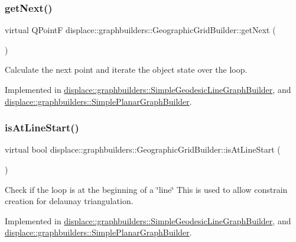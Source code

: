 \subsubsection{\texorpdfstring{getNext()}{getNext()}}
{\footnotesize\ttfamily virtual Q\+PointF displace\+::graphbuilders\+::\+Geographic\+Grid\+Builder\+::get\+Next (\begin{DoxyParamCaption}{ }\end{DoxyParamCaption})\hspace{0.3cm}{\ttfamily [pure virtual]}}



Calculate the next point and iterate the object state over the loop. 



Implemented in \mbox{\hyperlink{classdisplace_1_1graphbuilders_1_1_simple_geodesic_line_graph_builder_a219f40fcae3c1463aa7f818687ed5f39}{displace\+::graphbuilders\+::\+Simple\+Geodesic\+Line\+Graph\+Builder}}, and \mbox{\hyperlink{classdisplace_1_1graphbuilders_1_1_simple_planar_graph_builder_a58f7a91f6889c37b462abaaf0844c49b}{displace\+::graphbuilders\+::\+Simple\+Planar\+Graph\+Builder}}.

\mbox{\label{classdisplace_1_1graphbuilders_1_1_geographic_grid_builder_ac04ab8be97b357bb12f9745a012f6a5f}} 
\subsubsection{\texorpdfstring{isAtLineStart()}{isAtLineStart()}}
{\footnotesize\ttfamily virtual bool displace\+::graphbuilders\+::\+Geographic\+Grid\+Builder\+::is\+At\+Line\+Start (\begin{DoxyParamCaption}{ }\end{DoxyParamCaption})\hspace{0.3cm}{\ttfamily [pure virtual]}}



Check if the loop is at the beginning of a \char`\"{}line\char`\"{} This is used to allow constrain creation for delaunay triangulation. 



Implemented in \mbox{\hyperlink{classdisplace_1_1graphbuilders_1_1_simple_geodesic_line_graph_builder_ab13312aee2a6410568267d4c697f34c7}{displace\+::graphbuilders\+::\+Simple\+Geodesic\+Line\+Graph\+Builder}}, and \mbox{\hyperlink{classdisplace_1_1graphbuilders_1_1_simple_planar_graph_builder_ad5a6e8911d9599a5331facc31c5caa11}{displace\+::graphbuilders\+::\+Simple\+Planar\+Graph\+Builder}}.



